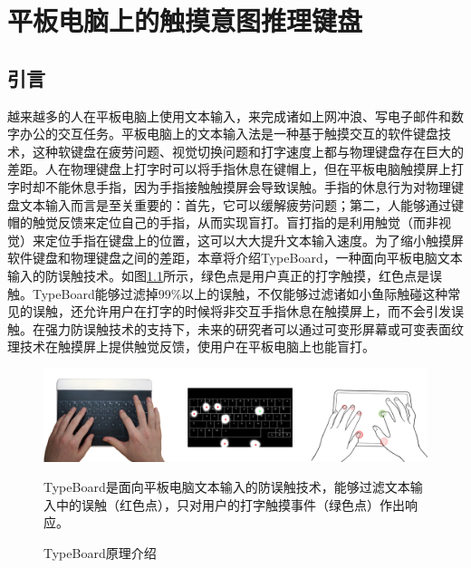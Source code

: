 
\chapter{平板电脑上的触摸意图推理键盘}\label{section:TypeBoard}

\section{引言}

越来越多的人在平板电脑上使用文本输入，来完成诸如上网冲浪、写电子邮件和数字办公\cite{2018-Japanese}的交互任务。平板电脑上的文本输入法是一种基于触摸交互的软件键盘技术，这种软键盘在疲劳问题\cite{2014-Differences}、视觉切换问题\cite{lu2017blindtype, 2010-NoLook, 2010-Eyes}和打字速度\cite{1991-Improving, findlater2011typing}上都与物理键盘存在巨大的差距。人在物理键盘上打字时可以将手指休息在键帽上，但在平板电脑触摸屏上打字时却不能休息手指，因为手指接触触摸屏会导致误触。手指的休息行为对物理键盘文本输入而言是至关重要的：首先，它可以缓解疲劳问题\cite{2013-TapBoard}；第二，人能够通过键帽的触觉反馈来定位自己的手指，从而实现盲打\cite{2010-Warning, 1995-Use, 2011-Hierarchical, 2015-Haptic}。盲打指的是利用触觉（而非视觉）来定位手指在键盘上的位置，这可以大大提升文本输入速度。为了缩小触摸屏软件键盘和物理键盘之间的差距，本章将介绍TypeBoard，一种面向平板电脑文本输入的防误触技术。如图\ref{fig:TypeBoard_teaser}所示，绿色点是用户真正的打字触摸，红色点是误触。TypeBoard能够过滤掉99\%以上的误触，不仅能够过滤诸如小鱼际触碰这种常见的误触，还允许用户在打字的时候将非交互手指休息在触摸屏上，而不会引发误触。在强力防误触技术的支持下，未来的研究者可以通过可变形屏幕\cite{Website-Tactus}或可变表面纹理技术\cite{2011-Stimtac, 2010-TeslaTouch, 2011-Enhancing}在触摸屏上提供触觉反馈，使用户在平板电脑上也能盲打。

\begin{figure}[!htbp]
	\centering
	\includegraphics[width=\textwidth]{figures/TypeBoard_teaser.png}
	\caption*{TypeBoard是面向平板电脑文本输入的防误触技术，能够过滤文本输入中的误触（红色点），只对用户的打字触摸事件（绿色点）作出响应。}
	\caption{TypeBoard原理介绍}
	\label{fig:TypeBoard_teaser}
\end{figure}

